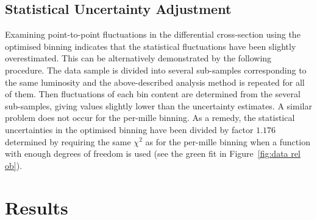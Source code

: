 \subsection{Statistical Uncertainty Adjustment}
\label{sec:stat unc adj}
%
Examining point-to-point fluctuations in the differential cross-section using the optimised binning indicates that the statistical fluctuations have been slightly overestimated. This can be alternatively demonstrated by the following procedure. The data sample is divided into several sub-samples corresponding to the same luminosity and the above-described analysis method is repeated for all of them. Then fluctuations of each bin content are determined from the several sub-samples, giving values slightly lower than the uncertainty estimates. A similar problem does not occur for the per-mille binning.
As a remedy, the statistical uncertainties in the optimised binning have been divided by factor $1.176$ determined by requiring the same $\chi^2$ as for the per-mille binning when a function with enough degrees of freedom is used (see the green fit in Figure~\ref{fig:data rel ob}).


\section{Results}


